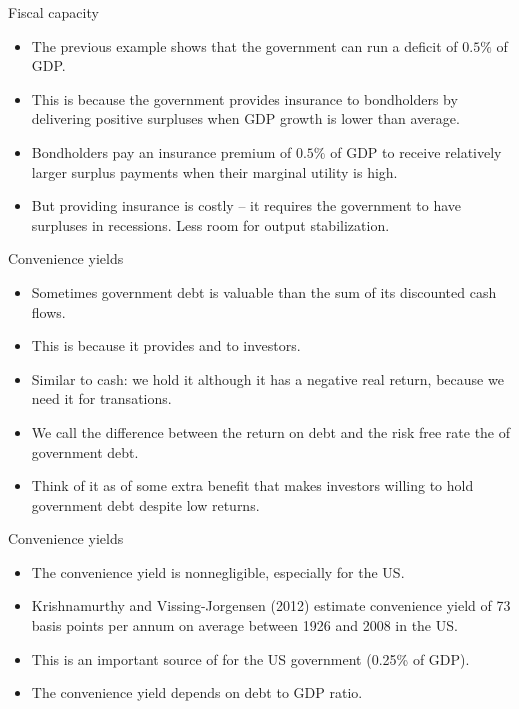 \documentclass[11pt,xcolor={dvipsnames},aspectratio=159,hyperref={pdftex,pdfpagemode=UseNone,hidelinks,pdfdisplaydoctitle=true},usepdftitle=false]{beamer}
\begin{document}
\begin{frame}{Fiscal capacity}  
    \begin{itemize}
    \item The previous example shows that the government can  run a deficit of $0.5\%$ of GDP.
    \item This is because the government provides insurance
    to bondholders by delivering positive surpluses when GDP growth is lower than average.
    \item Bondholders pay an insurance premium of $0.5\%$ of GDP to receive relatively larger surplus payments when their marginal utility is high.
    \item But providing insurance is costly -- it requires the government to have surpluses in recessions. Less room for output stabilization.
    \end{itemize}
\end{frame}


\begin{frame}{Convenience yields}  
    \begin{itemize}
    \item Sometimes government debt is  valuable than the sum of its discounted cash flows.
    \item This is because it provides  and  to investors.
    \item Similar to cash: we hold it although it has a negative real return, because we need it for transations.
    \item We call the difference between the return on debt and the risk free rate the  of government debt.
    \item Think of it as of some extra benefit that makes investors willing to hold government debt despite low returns.    
    \end{itemize}
\end{frame}

\begin{frame}{Convenience yields}  
    \begin{itemize}
    \item The convenience yield is nonnegligible, especially for the US.
    \item Krishnamurthy and Vissing-Jorgensen (2012) estimate convenience yield of 73 basis points per annum on average between 1926 and 2008 in the US.
    \item This is an important source of  for the US government (0.25\% of GDP).
    \item The convenience yield depends on debt to GDP ratio.
    \end{itemize}
\end{frame}
\end{document}
